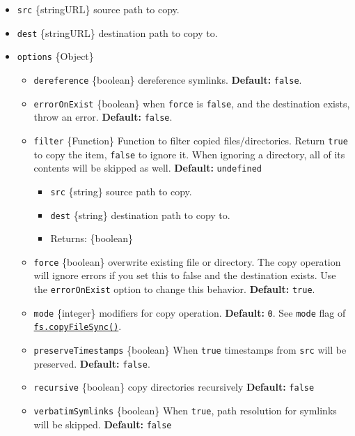 \begin{itemize}
\tightlist
\item
  \texttt{src} \{string\textbar URL\} source path to copy.
\item
  \texttt{dest} \{string\textbar URL\} destination path to copy to.
\item
  \texttt{options} \{Object\}

  \begin{itemize}
  \tightlist
  \item
    \texttt{dereference} \{boolean\} dereference symlinks.
    \textbf{Default:} \texttt{false}.
  \item
    \texttt{errorOnExist} \{boolean\} when \texttt{force} is
    \texttt{false}, and the destination exists, throw an error.
    \textbf{Default:} \texttt{false}.
  \item
    \texttt{filter} \{Function\} Function to filter copied
    files/directories. Return \texttt{true} to copy the item,
    \texttt{false} to ignore it. When ignoring a directory, all of its
    contents will be skipped as well. \textbf{Default:}
    \texttt{undefined}

    \begin{itemize}
    \tightlist
    \item
      \texttt{src} \{string\} source path to copy.
    \item
      \texttt{dest} \{string\} destination path to copy to.
    \item
      Returns: \{boolean\}
    \end{itemize}
  \item
    \texttt{force} \{boolean\} overwrite existing file or directory. The
    copy operation will ignore errors if you set this to false and the
    destination exists. Use the \texttt{errorOnExist} option to change
    this behavior. \textbf{Default:} \texttt{true}.
  \item
    \texttt{mode} \{integer\} modifiers for copy operation.
    \textbf{Default:} \texttt{0}. See \texttt{mode} flag of
    \hyperref[fscopyfilesyncsrc-dest-mode]{\texttt{fs.copyFileSync()}}.
  \item
    \texttt{preserveTimestamps} \{boolean\} When \texttt{true}
    timestamps from \texttt{src} will be preserved. \textbf{Default:}
    \texttt{false}.
  \item
    \texttt{recursive} \{boolean\} copy directories recursively
    \textbf{Default:} \texttt{false}
  \item
    \texttt{verbatimSymlinks} \{boolean\} When \texttt{true}, path
    resolution for symlinks will be skipped. \textbf{Default:}
    \texttt{false}
  \end{itemize}
\end{itemize}

